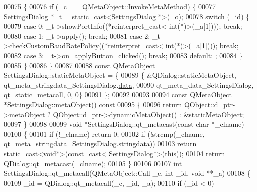 \begin{DoxyCode}
00075 \{
00076     \textcolor{keywordflow}{if} (\_c == QMetaObject::InvokeMetaMethod) \{
00077         \hyperlink{a00022}{SettingsDialog} *\_t = \textcolor{keyword}{static\_cast<}\hyperlink{a00022}{SettingsDialog} *\textcolor{keyword}{>}(\_o);
00078         \textcolor{keywordflow}{switch} (\_id) \{
00079         \textcolor{keywordflow}{case} 0: \_t->showPortInfo((*\textcolor{keyword}{reinterpret\_cast<} \textcolor{keywordtype}{int}(*)\textcolor{keyword}{>}(\_a[1]))); \textcolor{keywordflow}{break};
00080         \textcolor{keywordflow}{case} 1: \_t->apply(); \textcolor{keywordflow}{break};
00081         \textcolor{keywordflow}{case} 2: \_t->checkCustomBaudRatePolicy((*\textcolor{keyword}{reinterpret\_cast<} \textcolor{keywordtype}{int}(*)\textcolor{keyword}{>}(\_a[1]))); \textcolor{keywordflow}{break};
00082         \textcolor{keywordflow}{case} 3: \_t->on\_applyButton\_clicked(); \textcolor{keywordflow}{break};
00083         \textcolor{keywordflow}{default}: ;
00084         \}
00085     \}
00086 \}
00087 
00088 \textcolor{keyword}{const} QMetaObject SettingsDialog::staticMetaObject = \{
00089     \{ &QDialog::staticMetaObject, qt\_meta\_stringdata\_SettingsDialog.\hyperlink{a00018_a320edc752a589bd0171189d51579680e}{data},
00090       qt\_meta\_data\_SettingsDialog,  qt\_static\_metacall, 0, 0\}
00091 \};
00092 
00093 
00094 \textcolor{keyword}{const} QMetaObject *SettingsDialog::metaObject()\textcolor{keyword}{ const}
00095 \textcolor{keyword}{}\{
00096     \textcolor{keywordflow}{return} QObject::d\_ptr->metaObject ? QObject::d\_ptr->dynamicMetaObject() : &staticMetaObject;
00097 \}
00098 
00099 \textcolor{keywordtype}{void} *SettingsDialog::qt\_metacast(\textcolor{keyword}{const} \textcolor{keywordtype}{char} *\_clname)
00100 \{
00101     \textcolor{keywordflow}{if} (!\_clname) \textcolor{keywordflow}{return} 0;
00102     \textcolor{keywordflow}{if} (!strcmp(\_clname, qt\_meta\_stringdata\_SettingsDialog.\hyperlink{a00018_ab803985b8fecb8e67a35ab5a3939845b}{stringdata}))
00103         \textcolor{keywordflow}{return} \textcolor{keyword}{static\_cast<}\textcolor{keywordtype}{void}*\textcolor{keyword}{>}(\textcolor{keyword}{const\_cast<} \hyperlink{a00022}{SettingsDialog}*\textcolor{keyword}{>}(\textcolor{keyword}{this}));
00104     \textcolor{keywordflow}{return} QDialog::qt\_metacast(\_clname);
00105 \}
00106 
00107 \textcolor{keywordtype}{int} SettingsDialog::qt\_metacall(QMetaObject::Call \_c, \textcolor{keywordtype}{int} \_id, \textcolor{keywordtype}{void} **\_a)
00108 \{
00109     \_id = QDialog::qt\_metacall(\_c, \_id, \_a);
00110     \textcolor{keywordflow}{if} (\_id < 0)

\end{DoxyCode}
